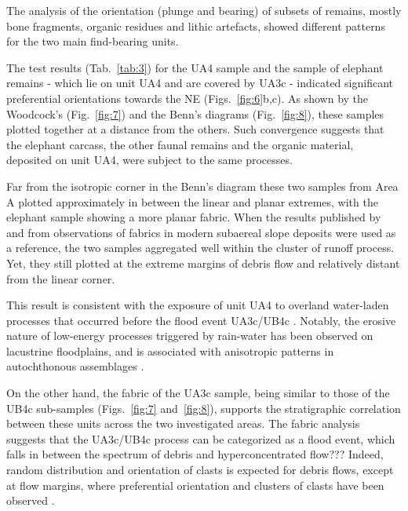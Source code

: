 \documentclass[preprint,authoryear,times]{elsarticle} %
\begin{document}
The analysis of the orientation (plunge and bearing) of subsets of remains, mostly bone fragments, organic residues and lithic artefacts, showed different patterns for the two main find-bearing units.


The test results (Tab.~\ref{tab:3}) for the UA4 sample and the sample of elephant remains - which lie on unit UA4 and are covered by UA3c - indicated significant preferential orientations towards the NE (Figs.~\ref{fig:6}b,c). As shown by the Woodcock's (Fig.~\ref{fig:7}) and the Benn's diagrams (Fig.~\ref{fig:8}), these samples plotted together at a distance from the others. Such convergence suggests that the elephant carcass, the other faunal remains and the organic material, deposited on unit UA4, were subject to the same processes.

Far from the isotropic corner in the Benn's diagram these two samples from Area A plotted approximately in between the linear and planar extremes, with the elephant sample showing a more planar fabric. When the results published by \cite{Bertran1997} and \cite{Lenoble2004} from observations of fabrics in modern subaereal slope deposits were used as a reference, the two samples aggregated well within the cluster of runoff process. Yet, they still plotted at the extreme margins of debris flow and relatively distant from the linear corner.


This result is consistent with the exposure of unit UA4 to overland water-laden processes that occurred before the flood event UA3c/UB4c \citep{Karkanas}. Notably, the erosive nature of low-energy processes triggered by rain-water has been observed on lacustrine floodplains, and is associated with anisotropic patterns in autochthonous assemblages \citep{Cobo-Sanchez2014,Dominguez-Rodrigo2014,Garcia-Moreno2016}.

On the other hand, the fabric of the UA3c sample, being similar to those of the UB4c sub-samples (Figs.~\ref{fig:7} and~\ref{fig:8}), supports the stratigraphic correlation between these units across the two investigated areas. The fabric analysis suggests that the UA3c/UB4c process can be categorized as a flood event, which falls in between the spectrum of debris and hyperconcentrated flow??? Indeed, random distribution and orientation of clasts is expected for debris flows, except at flow margins, where preferential orientation and clusters of clasts have been observed \citep{Pierson2005}.
\end{document}
